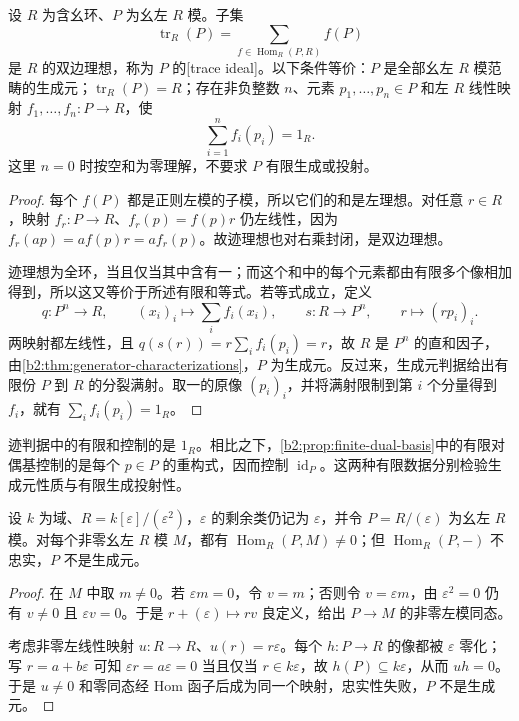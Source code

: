 \begin{proposition}\label{b2:prop:trace-generator-criterion}
	设 \(R\) 为含幺环、\(P\) 为幺左 \(R\) 模。子集
	\[
		\operatorname{tr}_R(P)=\sum_{f\in\operatorname{Hom}_R(P,R)}f(P)
	\]
	是 \(R\) 的双边理想，称为 \(P\) 的[trace ideal]。以下条件等价：\(P\) 是全部幺左 \(R\) 模范畴的生成元；\(\operatorname{tr}_R(P)=R\)；存在非负整数 \(n\)、元素 \(p_1,\ldots,p_n\in P\) 和左 \(R\) 线性映射 \(f_1,\ldots,f_n:P\to R\)，使
	\[
		\sum_{i=1}^n f_i(p_i)=1_R.
	\]
	这里 \(n=0\) 时按空和为零理解，不要求 \(P\) 有限生成或投射。
\end{proposition}
\begin{proof}
	每个 \(f(P)\) 都是正则左模的子模，所以它们的和是左理想。对任意 \(r\in R\)，映射 \(f_r:P\to R\)、\(f_r(p)=f(p)r\) 仍左线性，因为 \(f_r(ap)=af(p)r=af_r(p)\)。故迹理想也对右乘封闭，是双边理想。

	迹理想为全环，当且仅当其中含有一；而这个和中的每个元素都由有限多个像相加得到，所以这又等价于所述有限和等式。若等式成立，定义
	\[
		q:P^n\longrightarrow R,\qquad (x_i)_i\longmapsto\sum_i f_i(x_i), \qquad s:R\longrightarrow P^n,\qquad r\longmapsto(rp_i)_i.
	\]
	两映射都左线性，且 \(q(s(r))=r\sum_i f_i(p_i)=r\)，故 \(R\) 是 \(P^n\) 的直和因子，由\cref{b2:thm:generator-characterizations}，\(P\) 为生成元。反过来，生成元判据给出有限份 \(P\) 到 \(R\) 的分裂满射。取一的原像 \((p_i)_i\)，并将满射限制到第 \(i\) 个分量得到 \(f_i\)，就有 \(\sum_i f_i(p_i)=1_R\)。
\end{proof}

迹判据中的有限和控制的是 \(1_R\)。相比之下，\cref{b2:prop:finite-dual-basis}中的有限对偶基控制的是每个 \(p\in P\) 的重构式，因而控制 \(\operatorname{id}_P\)。这两种有限数据分别检验生成元性质与有限生成投射性。

\begin{proposition}\label{b2:prop:object-detection-not-generator}
	设 \(k\) 为域、\(R=k[\varepsilon]/(\varepsilon^2)\)，\(\varepsilon\) 的剩余类仍记为 \(\varepsilon\)，并令 \(P=R/(\varepsilon)\) 为幺左 \(R\) 模。对每个非零幺左 \(R\) 模 \(M\)，都有 \(\operatorname{Hom}_R(P,M)\ne0\)；但 \(\operatorname{Hom}_R(P,-)\) 不忠实，\(P\) 不是生成元。
\end{proposition}
\begin{proof}
	在 \(M\) 中取 \(m\ne0\)。若 \(\varepsilon m=0\)，令 \(v=m\)；否则令 \(v=\varepsilon m\)，由 \(\varepsilon^2=0\) 仍有 \(v\ne0\) 且 \(\varepsilon v=0\)。于是 \(r+(\varepsilon)\mapsto rv\) 良定义，给出 \(P\to M\) 的非零左模同态。

	考虑非零左线性映射 \(u:R\to R\)、\(u(r)=r\varepsilon\)。每个 \(h:P\to R\) 的像都被 \(\varepsilon\) 零化；写 \(r=a+b\varepsilon\) 可知 \(\varepsilon r=a\varepsilon=0\) 当且仅当 \(r\in k\varepsilon\)，故 \(h(P)\subseteq k\varepsilon\)，从而 \(uh=0\)。于是 \(u\ne0\) 和零同态经 Hom 函子后成为同一个映射，忠实性失败，\(P\) 不是生成元。
\end{proof}

